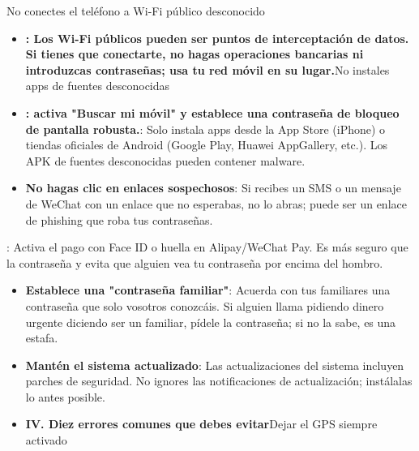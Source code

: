 


No conectes el teléfono a Wi-Fi público desconocido

\begin{itemize}
  \item \textbf{: Los Wi-Fi públicos pueden ser puntos de interceptación de datos. Si tienes que conectarte, no hagas operaciones bancarias ni introduzcas contraseñas; usa tu red móvil en su lugar.}No instales apps de fuentes desconocidas
  \item \textbf{: activa "Buscar mi móvil" y establece una contraseña de bloqueo de pantalla robusta.}: Solo instala apps desde la App Store (iPhone) o tiendas oficiales de Android (Google Play, Huawei AppGallery, etc.). Los APK de fuentes desconocidas pueden contener malware.
  \item \textbf{No hagas clic en enlaces sospechosos}: Si recibes un SMS o un mensaje de WeChat con un enlace que no esperabas, no lo abras; puede ser un enlace de phishing que roba tus contraseñas.
\end{itemize}


: Activa el pago con Face ID o huella en Alipay/WeChat Pay. Es más seguro que la contraseña y evita que alguien vea tu contraseña por encima del hombro.

\begin{itemize}
  \item \textbf{Establece una "contraseña familiar"}: Acuerda con tus familiares una contraseña que solo vosotros conozcáis. Si alguien llama pidiendo dinero urgente diciendo ser un familiar, pídele la contraseña; si no la sabe, es una estafa.
  \item \textbf{Mantén el sistema actualizado}: Las actualizaciones del sistema incluyen parches de seguridad. No ignores las notificaciones de actualización; instálalas lo antes posible.
  \item \textbf{IV. Diez errores comunes que debes evitar}Dejar el GPS siempre activado
\end{itemize}


